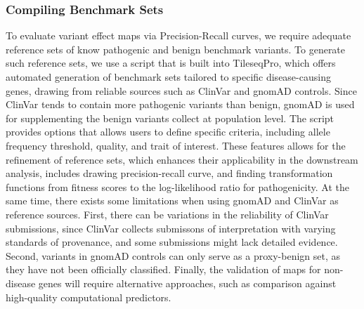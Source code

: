 \documentclass{article}
\begin{document}
\subsubsection{Compiling Benchmark Sets} 
To evaluate variant effect maps via Precision-Recall curves, we require adequate reference sets of know pathogenic and benign benchmark variants. To generate such reference sets, we use a script that is built into TileseqPro, which offers automated generation of benchmark sets tailored to specific disease-causing genes, drawing from reliable sources such as
ClinVar\cite{10.1093/nar/gkx1153} and gnomAD\cite{Chen2022.03.20.485034} controls.
Since ClinVar tends to contain more pathogenic variants than benign, gnomAD is used for supplementing the benign variants collect at population level.
The script provides options that allows users to define specific criteria, including allele frequency threshold, quality, and trait of interest. These features allows for the refinement of reference sets, which enhances their applicability in the downstream analysis, includes drawing precision-recall curve, and finding transformation functions from fitness scores to the log-likelihood ratio for pathogenicity. At the same time, there exists some limitations when using gnomAD and ClinVar as reference sources. First, there can be variations in the reliability of ClinVar submissions, since ClinVar collects submissons of interpretation with varying standards of provenance, and some submissions might lack detailed evidence. Second,  variants in gnomAD controls can only serve as a proxy-benign set, as they have not been officially classified. Finally, the validation of maps for non-disease genes will require alternative approaches, such as comparison against high-quality computational predictors.


\end{document}
